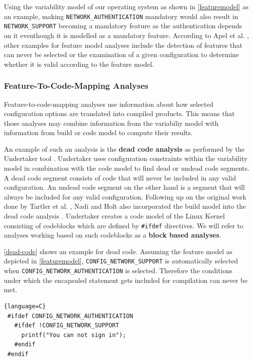 \documentclass[a4paper]{article}
\begin{document}
Using the variability model of our operating system as shown in \autoref{featuremodel} as an example, making \texttt{NETWORK\_AUTHENTICATION} mandatory would also result in \texttt{NETWORK\_SUPPORT} becoming a mandatory feature as the authentication depends on it eventhough it is modelled as a mandatory feature.  According to Apel et al. \cite{Apel:2013:FSP:2541773}, other examples for feature model analyses include the detection of features that can never be selected or the examination of a given configuration to determine whether it is valid according to the feature model.

\subsubsection{Feature-To-Code-Mapping Analyses}\label{feature-code-mapping}

Feature-to-code-mapping analyses use information about how selected configuration options are translated into compiled products. This means that those analyses may combine information from the variabiliy model with information from build or code model to compute their results.

An example of such an analysis is the \textbf{dead code analysis} as performed by the Undertaker tool \cite{Tartler:2011:FCC:1966445.1966451}. Undertaker uses configuration constraints within the variability model in combination with the code model to find dead or undead code segments. A dead code segment consists of code that will never be included in any valid configuration. An undead code segment on the other hand is a segment that will always be included for any valid configuration. Following up on the original work done by  Tartler et al. \cite{Tartler:2011:FCC:1966445.1966451}, Nadi and Holt also incorporated the build model into the dead code analysis \cite{mining-kbuild}. Undertaker creates a code model of the Linux Kernel consisting of codeblocks which are defined by \texttt{\#ifdef} directives. We will refer to analyses working based on such codeblocks as a \textbf{block based analyses}.

\autoref{dead-code} shows an example for dead code. Assuming the feature model as depicted in \autoref{featuremodel}, \texttt{CONFIG\_NETWORK\_SUPPORT} is automatically selected when \texttt{CONFIG\_NETWORK\_AUTHENTICATION} is selected. Therefore the conditions under which the encapsuled statement gets included for compilation can never be met.

\begin{lstlisting}[caption=Dead Code, label=dead-code]{language=C}
 #ifdef CONFIG_NETWORK_AUTHENTICATION
   #ifdef !CONFIG_NETWORK_SUPPORT
     printf("You can not sign in");
   #endif
 #endif
\end{lstlisting}
\end{document}
